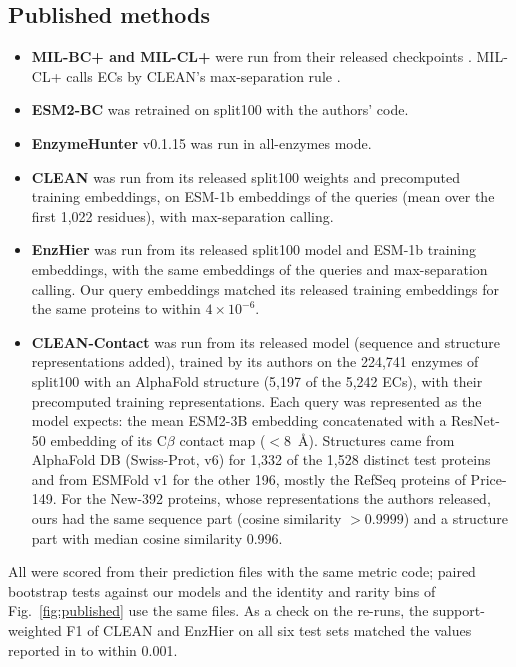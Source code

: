 \documentclass[11pt]{article}
\begin{document}
\subsection{Published methods}
\begin{itemize}
  \item \textbf{MIL-BC+ and MIL-CL+} were run from their released checkpoints \cite{milbc}. MIL-CL+ calls ECs by CLEAN's
        max-separation rule \cite{clean}.
  \item \textbf{ESM2-BC} was retrained on split100 with the authors' code.
  \item \textbf{EnzymeHunter} v0.1.15 \cite{enzymehunter} was run in all-enzymes mode.
  \item \textbf{CLEAN} \cite{clean} was run from its released split100 weights and precomputed training embeddings, on
        ESM-1b embeddings of the queries (mean over the first 1,022 residues), with max-separation calling.
  \item \textbf{EnzHier} \cite{enzhier} was run from its released split100 model and ESM-1b training embeddings, with
        the same embeddings of the queries and max-separation calling. Our query embeddings matched its released
        training embeddings for the same proteins to within $4\times10^{-6}$.
  \item \textbf{CLEAN-Contact} \cite{cleancontact} was run from its released model (sequence and structure
        representations added), trained by its authors on the 224,741 enzymes of split100 with an AlphaFold structure
        (5,197 of the 5,242 ECs), with their precomputed training representations. Each query was represented as the
        model expects: the mean ESM2-3B embedding concatenated with a ResNet-50 embedding of its C$\beta$ contact map
        ($<8$~\AA). Structures came from AlphaFold DB (Swiss-Prot, v6) for 1,332 of the 1,528 distinct test proteins
        and from ESMFold v1 \cite{esm2} for the other 196, mostly the RefSeq proteins of Price-149. For the New-392
        proteins, whose representations the authors released, ours had the same sequence part (cosine similarity
        $>0.9999$) and a structure part with median cosine similarity 0.996.
\end{itemize}
All were scored from their prediction files with the same metric code; paired bootstrap tests against our models
and the identity and rarity bins of Fig.~\ref{fig:published} use the same files. As a check on the re-runs, the
support-weighted F1 of CLEAN and EnzHier on all six test sets matched the values reported in \cite{milbc} to within
0.001.
\end{document}
